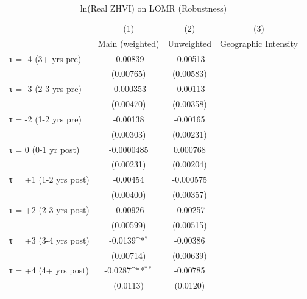 \begin{table}[htbp]\centering
\def\sym#1{\ifmmode^{#1}\else\(^{#1}\)\fi}
\caption{ln(Real ZHVI) on LOMR (Robustness)}
\begin{tabular}{l*{3}{c}}
\hline\hline
                    &\multicolumn{1}{c}{(1)}&\multicolumn{1}{c}{(2)}&\multicolumn{1}{c}{(3)}\\
                    &\multicolumn{1}{c}{Main (weighted)}&\multicolumn{1}{c}{Unweighted}&\multicolumn{1}{c}{Geographic Intensity}\\
\hline
τ = -4 (3+ yrs pre) &    -0.00839         &    -0.00513         &                     \\
                    &   (0.00765)         &   (0.00583)         &                     \\
[1em]
τ = -3 (2-3 yrs pre)&   -0.000353         &    -0.00113         &                     \\
                    &   (0.00470)         &   (0.00358)         &                     \\
[1em]
τ = -2 (1-2 yrs pre)&    -0.00138         &    -0.00165         &                     \\
                    &   (0.00303)         &   (0.00231)         &                     \\
[1em]
τ = 0 (0-1 yr post) &  -0.0000485         &    0.000768         &                     \\
                    &   (0.00231)         &   (0.00204)         &                     \\
[1em]
τ = +1 (1-2 yrs post)&    -0.00454         &   -0.000575         &                     \\
                    &   (0.00400)         &   (0.00357)         &                     \\
[1em]
τ = +2 (2-3 yrs post)&    -0.00926         &    -0.00257         &                     \\
                    &   (0.00599)         &   (0.00515)         &                     \\
[1em]
τ = +3 (3-4 yrs post)&     -0.0139\sym{*}  &    -0.00386         &                     \\
                    &   (0.00714)         &   (0.00639)         &                     \\
[1em]
τ = +4 (4+ yrs post)&     -0.0287\sym{**} &    -0.00785         &                     \\
                    &    (0.0113)         &    (0.0120)         &                     \\

\end{tabular}
\end{table}

